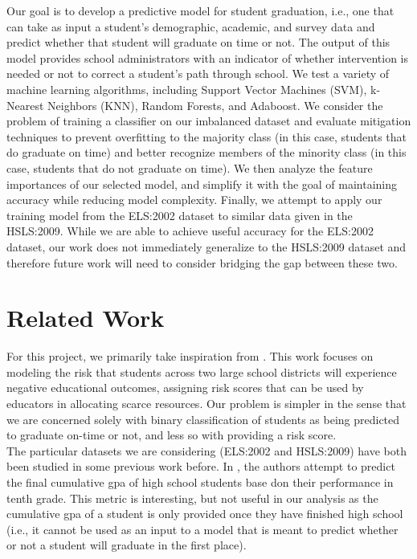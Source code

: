 \documentclass[conference]{IEEEtran}
\begin{document}
Our goal is to develop a predictive model for student graduation, i.e., one that can take as input a student's demographic, academic, and
survey data and predict whether that student will graduate on time or not. The output of this model provides school administrators with an
indicator of whether intervention is needed or not to correct a student's path through school. We test a variety of machine learning algorithms,
including Support Vector Machines (SVM), k-Nearest Neighbors (KNN), Random Forests, and Adaboost. We consider the problem of training a
classifier on our imbalanced dataset and evaluate mitigation techniques to prevent overfitting to the majority class (in this case, students that do
graduate on time) and better recognize members of the minority class (in this case, students that do not graduate on time). We then analyze the
feature importances of our selected model, and simplify it with the goal of maintaining accuracy while reducing model complexity. Finally, we attempt
to apply our training model from the ELS:2002 dataset to similar data given in the HSLS:2009. While we are able to achieve useful accuracy for the 
ELS:2002 dataset, our work does not immediately generalize to the HSLS:2009 dataset and therefore future work will need to consider bridging the gap
between these two. 

\section{Related Work}

For this project, we primarily take inspiration from \cite{b1}. This work focuses on modeling the risk that students across two large school districts
will experience negative educational outcomes, assigning risk scores that can be used by educators in allocating scarce resources. Our problem is simpler 
in the sense that we are concerned solely with binary classification of students as being predicted to graduate on-time or not, and less so with providing a 
risk score.\\

The particular datasets we are considering (ELS:2002 and HSLS:2009) have both been studied in some previous work before. In \cite{b2}, the authors attempt
to predict the final cumulative gpa of high school students base don their performance in tenth grade. This metric is interesting, but not useful in our analysis as
the cumulative gpa of a student is only provided once they have finished high school (i.e., it cannot be used as an input to a model that is meant to predict whether
or not a student will graduate in the first place).\\
\end{document}

